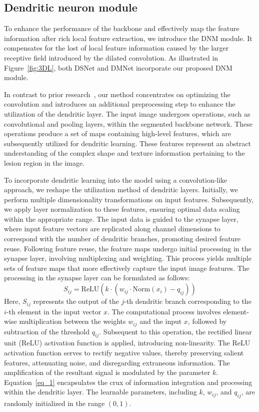 \documentclass[review]{elsarticle}
\begin{document}
	\subsection{Dendritic neuron module}
	\label{section:updating}
	To enhance the performance of the backbone and effectively map the feature information after rich local feature extraction, we introduce the DNM module. It compensates for the lost of local feature information caused by the larger receptive field introduced by the dilated convolution. As illustrated in Figure~\ref{fig:3DL}, both DSNet and DMNet incorporate our proposed DNM module.
	
	In contrast to prior research~\cite{li2023dendritic,zhang2024dendritic,NING2022108873}, our method concentrates on optimizing the convolution and introduces an additional preprocessing step to enhance the utilization of the dendritic layer. The input image undergoes operations, such as convolutional and pooling layers, within the segmented backbone network. These operations produce a set of maps containing high-level features, which are subsequently utilized for dendritic learning. These features represent an abstract understanding of the complex shape and texture information pertaining to the lesion region in the image. 
	
	To incorporate dendritic learning into the model using a convolution-like approach, we reshape the utilization method of dendritic layers. Initially, we perform multiple dimensionality transformations on input features. Subsequently, we apply layer normalization to these features, ensuring optimal data scaling within the appropriate range. The input data is guided to the synapse layer, where input feature vectors are replicated along channel dimensions to correspond with the number of dendritic branches, promoting desired feature reuse. Following feature reuse, the feature maps undergo initial processing in the synapse layer, involving multiplexing and weighting. This process yields multiple sets of feature maps that more effectively capture the input image features. The processing in the synapse layer can be formulated as follows:
	\begin{equation}
		S_{ij} = \text{ReLU}(k \cdot (w_{ij} \cdot \text{Norm}(x_i) - q_{ij}))
		\label{eq_1}
	\end{equation}
	Here, $S_{ij}$ represents the output of the $j$-th dendritic branch corresponding to the $i$-th element in the input vector $x$. The computational process involves element-wise multiplication between the weights $w_{ij}$ and the input $x$, followed by subtraction of the threshold $q_{ij}$. Subsequent to this operation, the rectified linear unit (ReLU) activation function is applied, introducing non-linearity. The ReLU activation function serves to rectify negative values, thereby preserving salient features, attenuating noise, and disregarding extraneous information. The amplification of the resultant signal is modulated by the parameter $k$. Equation~\ref{eq_1} encapsulates the crux of information integration and processing within the dendritic layer. The learnable parameters, including $k$, $w_{ij}$, and $q_{ij}$, are randomly initialized in the range $(0, 1)$.
\end{document}
